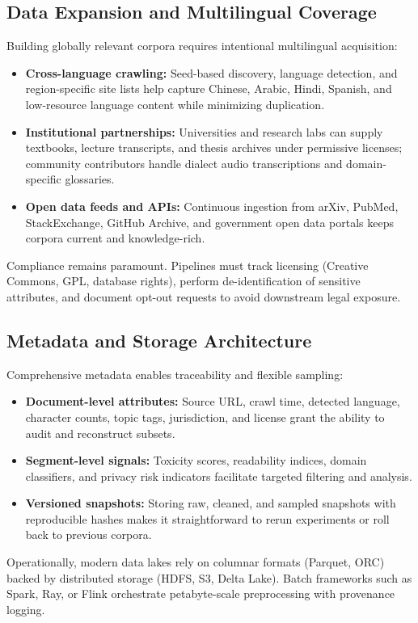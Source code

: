 \documentclass{article}
\begin{document}
\subsection{Data Expansion and Multilingual Coverage}
Building globally relevant corpora requires intentional multilingual acquisition:
\begin{itemize}
  \item \textbf{Cross-language crawling:} Seed-based discovery, language detection, and region-specific site lists help capture Chinese, Arabic, Hindi, Spanish, and low-resource language content while minimizing duplication.
  \item \textbf{Institutional partnerships:} Universities and research labs can supply textbooks, lecture transcripts, and thesis archives under permissive licenses; community contributors handle dialect audio transcriptions and domain-specific glossaries.
  \item \textbf{Open data feeds and APIs:} Continuous ingestion from arXiv, PubMed, StackExchange, GitHub Archive, and government open data portals keeps corpora current and knowledge-rich.
\end{itemize}
Compliance remains paramount. Pipelines must track licensing (Creative Commons, GPL, database rights), perform de-identification of sensitive attributes, and document opt-out requests to avoid downstream legal exposure.

\subsection{Metadata and Storage Architecture}
Comprehensive metadata enables traceability and flexible sampling:
\begin{itemize}
  \item \textbf{Document-level attributes:} Source URL, crawl time, detected language, character counts, topic tags, jurisdiction, and license grant the ability to audit and reconstruct subsets.
  \item \textbf{Segment-level signals:} Toxicity scores, readability indices, domain classifiers, and privacy risk indicators facilitate targeted filtering and analysis.
  \item \textbf{Versioned snapshots:} Storing raw, cleaned, and sampled snapshots with reproducible hashes makes it straightforward to rerun experiments or roll back to previous corpora.
\end{itemize}
Operationally, modern data lakes rely on columnar formats (Parquet, ORC) backed by distributed storage (HDFS, S3, Delta Lake). Batch frameworks such as Spark, Ray, or Flink orchestrate petabyte-scale preprocessing with provenance logging.
\end{document}

